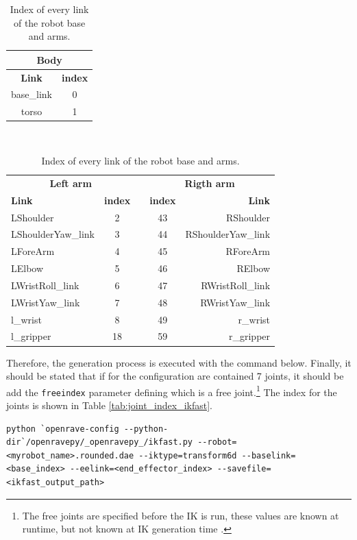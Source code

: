 \documentclass[12pt,a4paper,final,twoside,openright]{report}
\begin{document}
\begin{table}[!h]
\begin{center}
\begin{tabular}{|c|c|}
\hline
\multicolumn{2}{|c|}{\textbf{Body}} \\ \hline
\textbf{Link} & \textbf{index} \\ \hline
base\_link & 0 \\
torso & 1 \\
\end{tabular}
\\
\begin{tabular}{|l|c|c|c|r|}
\hline
\multicolumn{2}{|c|}{\textbf{Left arm}} & & \multicolumn{2}{|c|}{\textbf{Rigth arm}} \\ \cline{1-2}\cline{4-5}
\textbf{Link} & \textbf{index} & & \textbf{index} & \textbf{Link} \\ \cline{1-2}\cline{4-5}
LShoulder & 2 & & 43 & RShoulder \\
LShoulderYaw\_link & 3 & & 44 & RShoulderYaw\_link \\
LForeArm & 4 & & 45 & RForeArm \\
LElbow & 5 & & 46 & RElbow \\                            
LWristRoll\_link & 6 & & 47 & RWristRoll\_link \\                   
LWristYaw\_link & 7 & & 48 & RWristYaw\_link \\ \cline{1-2}\cline{4-5}
l\_wrist & 8 & & 49 & r\_wrist \\
l\_gripper & 18 & & 59 & r\_gripper \\ \hline
\end{tabular}
\caption{Index of every link of the robot base and arms.\label{tab:link_index_ikfast}}
\end{center}
\end{table}

Therefore, the generation process is executed with the command below. Finally, it should be stated that if for the configuration are contained 7 joints, it should be add the \texttt{freeindex} parameter defining which is a free joint.\footnote{The free joints are specified before the IK is run, these values are known at runtime, but not known at IK generation time \cite{Diankov2010}.} The index for the joints is shown in Table \ref{tab:joint_index_ikfast}.

\begin{lstlisting}
python `openrave-config --python-dir`/openravepy/_openravepy_/ikfast.py --robot=<myrobot_name>.rounded.dae --iktype=transform6d --baselink=<base_index> --eelink=<end_effector_index> --savefile=<ikfast_output_path>
\end{lstlisting}
\end{document}
